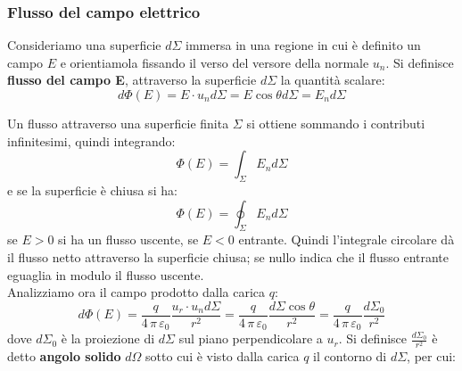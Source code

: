 \documentclass[a4paper,12pt, oneside]{book}
\begin{document}
\subsubsection{Flusso del campo elettrico}
Consideriamo una superficie $d\Sigma$ immersa in una regione in cui è definito un campo $E$ e orientiamola fissando il verso del versore della normale $u_n$. Si definisce \textbf{flusso del campo E}, attraverso la superficie $d\Sigma$ la quantità scalare:
$$d\Phi(E)=E\cdot u_nd\Sigma=E\cos \theta d\Sigma=E_nd\Sigma$$
\begin{center}
\end{center}
Un flusso attraverso una superficie finita $\Sigma$ si ottiene sommando i contributi infinitesimi, quindi integrando:
$$\Phi(E)=\int_\Sigma E_nd\Sigma$$
e se la superficie è chiusa si ha:
$$\Phi(E)=\oint_\Sigma E_nd\Sigma$$
se $E>0$ si ha un flusso uscente, se $E<0$ entrante. Quindi l'integrale circolare dà il flusso netto attraverso la superficie chiusa; se nullo indica che il flusso entrante eguaglia in modulo il flusso uscente.\\
Analizziamo ora il campo prodotto dalla carica $q$:
$$d\Phi(E)=\frac{q}{4\,\pi\,\varepsilon_0}\frac{u_r\cdot u_nd\Sigma}{r^2}=\frac{q}{4\,\pi\,\varepsilon_0}\frac{d\Sigma\cos \theta}{r^2}=\frac{q}{4\,\pi\,\varepsilon_0}\frac{d\Sigma_0}{r^2}$$
dove $d\Sigma_0$ è la proiezione di $d\Sigma$ sul piano perpendicolare a $u_r$. Si definisce $\frac{d\Sigma_0}{r^2}$ è detto \textbf{angolo solido} $d\Omega$ sotto cui è visto dalla carica $q$ il contorno di $d\Sigma$, per cui:
\end{document}
